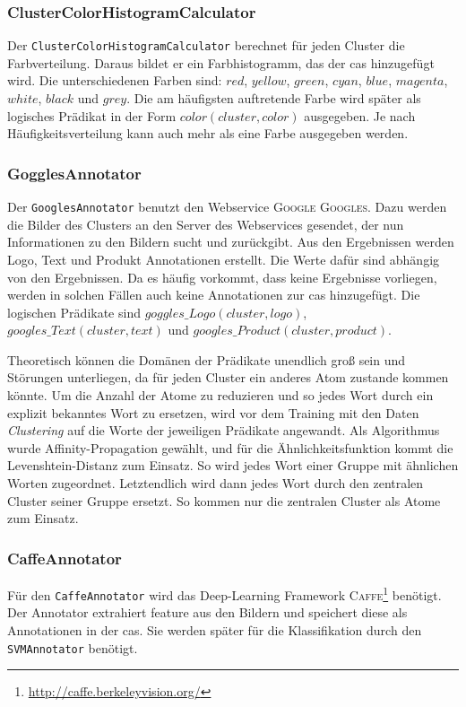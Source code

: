 \subsubsection{ClusterColorHistogramCalculator}
Der \texttt{ClusterColorHistogramCalculator} berechnet für jeden Cluster die Farbverteilung. Daraus bildet er ein Farbhistogramm, das der \gls{cas} hinzugefügt wird. Die unterschiedenen Farben sind: $red$, $yellow$, $green$, $cyan$, $blue$, $magenta$, $white$, $black$ und $grey$. Die am häufigsten auftretende Farbe wird später als logisches Prädikat in der Form $color(cluster,  color)$ ausgegeben. Je nach Häufigkeitsverteilung kann auch mehr als eine Farbe ausgegeben werden. 

\subsubsection{GogglesAnnotator}
Der \texttt{GooglesAnnotator} benutzt den Webservice \textsc{Google Googles}. Dazu werden die Bilder des Clusters an den Server des Webservices gesendet, der nun Informationen zu den Bildern sucht und zurückgibt. Aus den Ergebnissen werden Logo, Text und Produkt Annotationen erstellt. Die Werte dafür sind abhängig von den Ergebnissen. Da es häufig vorkommt, dass keine Ergebnisse vorliegen, werden in solchen Fällen auch keine Annotationen zur \gls{cas} hinzugefügt. Die logischen Prädikate sind $goggles\_Logo(cluster, logo)$, $googles\_Text(cluster, text)$ und $googles\_Product(cluster, product)$. \par

Theoretisch können die Domänen der Prädikate unendlich groß sein und Störungen unterliegen, da für jeden Cluster ein anderes Atom zustande kommen könnte. Um die Anzahl der Atome zu reduzieren und so jedes Wort durch ein explizit bekanntes Wort zu ersetzen, wird vor dem Training mit den Daten \textit{Clustering} auf die Worte der jeweiligen Prädikate angewandt. Als Algorithmus wurde Affinity-Propagation gewählt, und für die Ähnlichkeitsfunktion kommt die Levenshtein-Distanz zum Einsatz. So wird jedes Wort einer Gruppe mit ähnlichen Worten zugeordnet. Letztendlich wird dann jedes Wort durch den zentralen Cluster seiner Gruppe ersetzt. So kommen nur die zentralen Cluster als Atome zum Einsatz.


\subsubsection{CaffeAnnotator}
\label{sec:caffeAnno}
Für den \texttt{CaffeAnnotator} wird das Deep-Learning Framework \textsc{Caffe}\footnote{\url{http://caffe.berkeleyvision.org/}} benötigt. Der Annotator extrahiert \gls{feature} aus den Bildern und speichert diese als Annotationen in der \gls{cas}. Sie werden später für die Klassifikation durch den \texttt{SVMAnnotator} benötigt.  


